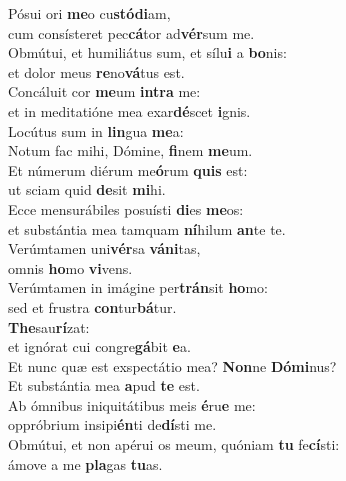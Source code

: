 \evenverse Pósui ori \textbf{me}o cu\textbf{stó}\textbf{di}am,~\*\\
\evenverse cum consísteret pec\textbf{cá}tor ad\textbf{vér}sum me.\\
\oddverse Obmútui, et humiliátus sum, et sílu\textbf{i} a \textbf{bo}nis:~\*\\
\oddverse et dolor meus \textbf{re}no\textbf{vá}tus est.\\
\evenverse Concáluit cor \textbf{me}um \textbf{in}\textbf{tra} me:~\*\\
\evenverse et in meditatióne mea exar\textbf{dé}scet \textbf{i}gnis.\\
\oddverse Locútus sum in \textbf{lin}gua \textbf{me}a:~\*\\
\oddverse Notum fac mihi, Dómine, \textbf{fi}nem \textbf{me}um.\\
\evenverse Et númerum diérum me\textbf{ó}rum \textbf{quis} est:~\*\\
\evenverse ut sciam quid \textbf{de}sit \textbf{mi}hi.\\
\oddverse Ecce mensurábiles posuísti \textbf{di}es \textbf{me}os:~\*\\
\oddverse et substántia mea tamquam \textbf{ní}hilum \textbf{an}te te.\\
\evenverse Verúmtamen uni\textbf{vér}sa \textbf{vá}\textbf{ni}tas,~\*\\
\evenverse omnis \textbf{ho}mo \textbf{vi}vens.\\
\oddverse Verúmtamen in imágine per\textbf{trán}sit \textbf{ho}mo:~\*\\
\oddverse sed et frustra \textbf{con}tur\textbf{bá}tur.\\
\evenverse \textbf{The}sau\textbf{rí}zat:~\*\\
\evenverse et ignórat cui congre\textbf{gá}bit \textbf{e}a.\\
\oddverse Et nunc quæ est exspectátio mea? \textbf{Non}ne \textbf{Dó}\textbf{mi}nus?~\*\\
\oddverse Et substántia mea \textbf{a}pud \textbf{te} est.\\
\evenverse Ab ómnibus iniquitátibus meis \textbf{é}ru\textbf{e} me:~\*\\
\evenverse oppróbrium insipi\textbf{én}ti de\textbf{dí}sti me.\\
\oddverse Obmútui, et non apérui os meum, quóniam \textbf{tu} fe\textbf{cí}sti:~\*\\
\oddverse ámove a me \textbf{pla}gas \textbf{tu}as.\\
